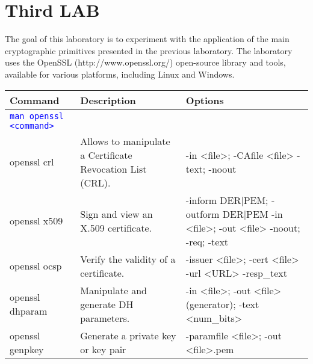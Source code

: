 \section{Third LAB}
\cite{LAB3}

The goal of this laboratory is to experiment with the application of the main cryptographic primitives presented in the previous laboratory. The laboratory uses the OpenSSL (http://www.openssl.org/) open-source library and tools, available for various platforms, including Linux and Windows.

\begin{table}[H]
	\centering
    \begin{tabular}{|p{5cm}|p{4cm}|p{7cm}|}\hline
        \rowcolor{gray!30}
		\textbf{Command} & \textbf{Description} & \textbf{Options} \\ \hline
		\textcolor{Blue}{\texttt{man openssl <command>}} 
			& 
			& 
        \\ \hline

        openssl crl
			& Allows to manipulate a Certificate Revocation List (CRL).
			& -in <file>; -CAfile <file> 
                \newline -text; -noout
        \\ \hline

        openssl x509
            & Sign and view an X.509 certificate.
            & -inform DER|PEM; -outform DER|PEM
                \newline -in <file>; -out <file>
                \newline -noout; -req; -text
        \\ \hline

        openssl ocsp
            & Verify the validity of a certificate.
            & -issuer <file>; -cert <file>
                \newline -url <URL>
                \newline -resp\_text
        \\ \hline

        openssl dhparam
            & Manipulate and generate DH parameters.
            & -in <file>; -out <file>
                \newline -2 (generator); -text
                \newline <num\_bits>
        \\ \hline

        openssl genpkey
            & Generate a private key or key pair
            & -paramfile <file>;
                \newline -out <file>.pem
        \\ \hline


\end{tabular}
\end{table}
